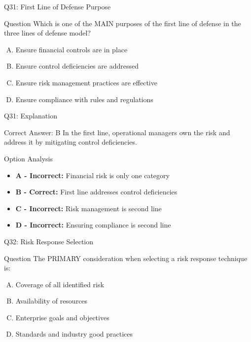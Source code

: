 \documentclass{beamer}
\begin{document}
	\begin{frame}{Q31: First Line of Defense Purpose}
		\begin{block}{Question}
			Which is one of the MAIN purposes of the first line of defense in the three lines of defense model?
		\end{block}
		\begin{enumerate}[(A)]
			\item Ensure financial controls are in place
			\item Ensure control deficiencies are addressed
			\item Ensure risk management practices are effective
			\item Ensure compliance with rules and regulations
		\end{enumerate}
	\end{frame}
	
	\begin{frame}{Q31: Explanation}
		\begin{block}{Correct Answer: B}
			In the first line, operational managers own the risk and address it by mitigating control deficiencies.
		\end{block}
		\begin{block}{Option Analysis}
			\begin{itemize}
				\item \textbf{A - Incorrect:} Financial risk is only one category
				\item \textbf{B - Correct:} First line addresses control deficiencies
				\item \textbf{C - Incorrect:} Risk management is second line
				\item \textbf{D - Incorrect:} Ensuring compliance is second line
			\end{itemize}
		\end{block}
	\end{frame}
	
	\begin{frame}{Q32: Risk Response Selection}
		\begin{block}{Question}
			The PRIMARY consideration when selecting a risk response technique is:
		\end{block}
		\begin{enumerate}[(A)]
			\item Coverage of all identified risk
			\item Availability of resources
			\item Enterprise goals and objectives
			\item Standards and industry good practices
		\end{enumerate}
	\end{frame}
	
\end{document}
